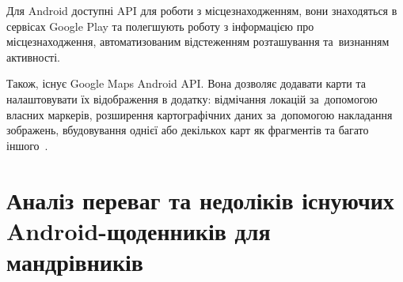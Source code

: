 \documentclass[../main.tex]{subfiles}
\begin{document}
Для Android доступні API для роботи з місцезнаходженням, вони знаходяться в сервісах Google Play та полегшують роботу з інформацією про місцезнаходження, автоматизованим відстеженням розташування та~визнанням активності. 

Також, існує Google Maps Android API. Вона дозволяє додавати карти та налаштовувати їх відображення в додатку: відмічання локацій за~допомогою власних маркерів, розширення картографічних даних за~допомогою накладання зображень, вбудовування однієї або декількох карт як фрагментів та багато іншого~\cite{google_maps}.

\section{Аналіз переваг та недоліків існуючих Android-щоденників для мандрівників}
\end{document}
